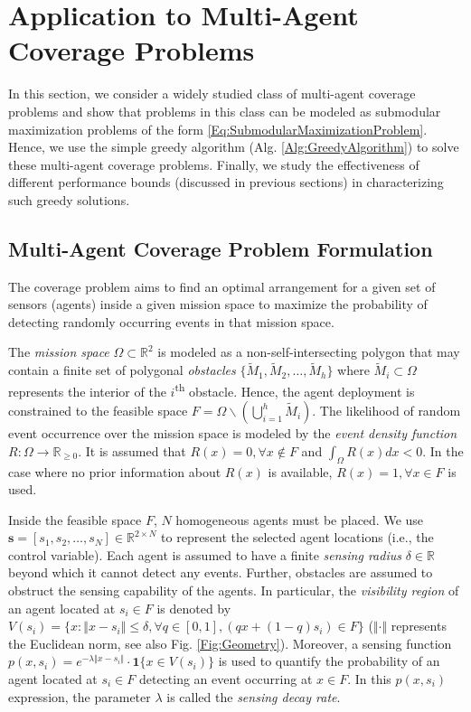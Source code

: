\documentclass[conference]{IEEEtran}
\newcommand{\R}{\mathbb{R}}
\begin{document}
\section{Application to Multi-Agent Coverage Problems}
\label{Sec:ApplicationToCoverageProblem}




In this section, we consider a widely studied class of multi-agent coverage problems \cite{Zhong2011,Sun2019,Welikala2019J1} and show that problems in this class can be modeled as submodular maximization problems of the form \eqref{Eq:SubmodularMaximizationProblem}. Hence, we use the simple greedy algorithm (Alg. \ref{Alg:GreedyAlgorithm}) to solve these multi-agent coverage problems. Finally, we study the effectiveness of different performance bounds (discussed in previous sections) in characterizing such greedy solutions.



\subsection{Multi-Agent Coverage Problem Formulation}

The coverage problem aims to find an optimal arrangement for a given set of sensors (agents) inside a given mission space to maximize the probability of detecting randomly occurring events in that mission space. 

The \emph{mission space} $\Omega\subset \R^2$ is modeled as a non-self-intersecting polygon \cite{Zhong2011} that may contain a finite set of polygonal \emph{obstacles} $\{\tilde{M}_1,\tilde{M}_2,\ldots,\tilde{M}_h\}$ where $\tilde{M}_i\subset \Omega$ represents the interior of the $i$\textsuperscript{th} obstacle. Hence, the agent deployment is constrained to the feasible space $F=\Omega \backslash (\bigcup_{i=1}^h \tilde{M}_i)$. The likelihood of random event occurrence over the mission space is modeled by the \emph{event density function} $R:\Omega\rightarrow \R_{\geq0}$. It is assumed that $R(x)=0, \forall x\not\in F$ and $\int_{\Omega}R(x)dx<0$. In the case where no prior information about $R(x)$ is available, $R(x)=1, \forall x \in F$ is used. 

Inside the feasible space $F$, $N$ homogeneous agents must be placed. We use $\mathbf{s} = [s_1,s_2,\ldots,s_N] \in \R^{2\times N}$ to represent the selected agent locations (i.e., the control variable). Each agent is assumed to have a finite \emph{sensing radius} $\delta \in \R$ beyond which it cannot detect any events. Further, obstacles are assumed to obstruct the sensing capability of the agents. In particular, the \emph{visibility region} of an agent located at $s_i\in F$ is denoted by $V(s_i) = \{x:\Vert x - s_i\Vert \leq \delta, \forall q \in [0,1], (q x + (1-q)s_i)\in F \}$ ($\Vert \cdot \Vert$ represents the Euclidean norm, see also Fig. \ref{Fig:Geometry}). Moreover, a sensing function $p(x,s_i)= e^{-\lambda\Vert x-s_i \Vert}\cdot \textbf{1}\{x\in V(s_i)\}$ is used to quantify the probability of an agent located at $s_i \in F$ detecting an event occurring at $x\in F$. In this $p(x,s_i)$ expression, the parameter $\lambda$ is called the \emph{sensing decay rate}. 
\end{document}
